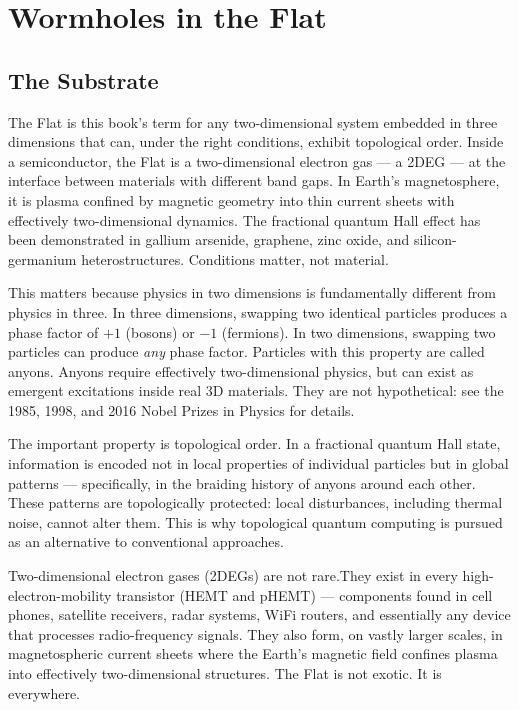 
\chapter{Wormholes in the Flat}
\label{ch:what-is-the-flat}

\section*{The Substrate}
\label{what-is-the-flat:the-substrate}

The Flat is this book's term for any two-dimensional system embedded in three dimensions that can, under the right conditions, exhibit topological order. Inside a semiconductor, the Flat is a two-dimensional electron gas --- a 2DEG --- at the interface between materials with different band gaps. In Earth's magnetosphere, it is plasma confined by magnetic geometry into thin current sheets with effectively two-dimensional dynamics. The fractional quantum Hall effect has been demonstrated in gallium arsenide, graphene, zinc oxide, and silicon-germanium heterostructures. Conditions matter, not material.

This matters because physics in two dimensions is fundamentally different from physics in three. In three dimensions, swapping two identical particles produces a phase factor of $+1$ (bosons) or $-1$ (fermions). In two dimensions, swapping two particles can produce \textit{any} phase factor. Particles with this property are called anyons. Anyons require effectively two-dimensional physics, but can exist as emergent excitations inside real 3D materials. They are not hypothetical: see the 1985, 1998, and 2016 Nobel Prizes in Physics for details.

The important property is topological order. In a fractional quantum Hall state, information is encoded not in local properties of individual particles but in global patterns --- specifically, in the braiding history of anyons around each other. These patterns are topologically protected: local disturbances, including thermal noise, cannot alter them. This is why topological quantum computing is pursued as an alternative to conventional approaches.

Two-dimensional electron gases (2DEGs) are not rare.They exist in every high-electron-mobility transistor (HEMT and pHEMT) --- components found in cell phones, satellite receivers, radar systems, WiFi routers, and essentially any device that processes radio-frequency signals. They also form, on vastly larger scales, in magnetospheric current sheets where the Earth's magnetic field confines plasma into effectively two-dimensional structures. The Flat is not exotic. It is everywhere.


